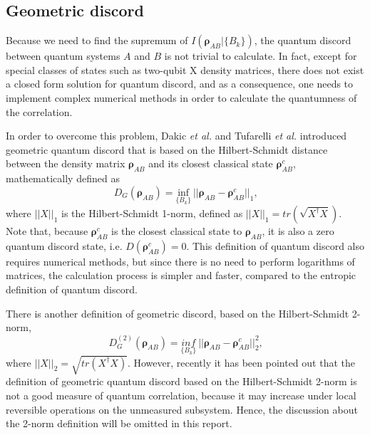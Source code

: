 \documentclass[%
 reprint,
 amsmath,amssymb,
 aps,
]{revtex4-1}
\begin{document}
\subsection{Geometric discord}
\noindent Because we need to find the supremum of $\textit{I}(\boldsymbol{\rho}_{AB}|\{B_k\})$, the quantum discord between quantum systems $A$ and $B$ is not trivial to calculate. In fact, except for special classes of states such as two-qubit X density matrices, there does not exist a closed form solution for quantum discord, and as a consequence, one needs to implement complex numerical methods in order to calculate the quantumness of the correlation. 

In order to overcome this problem, Dakic \textit{et al.} and Tufarelli \textit{et al.} introduced geometric quantum discord that is based on the Hilbert-Schmidt distance between the density matrix $\boldsymbol{\rho}_{AB}$ and its closest classical state $\boldsymbol{\rho}_{AB}^{c}$, mathematically defined as
\begin{equation}
\textit{D}_G(\boldsymbol{\rho}_{AB}) = \underset{\{B_k\}}{\text{inf}}\  ||\boldsymbol{\rho}_{AB} - \boldsymbol{\rho}_{AB}^{c}||_{1}  \label{geom.} \text{,}
\end{equation}
\noindent where $||X||_{1}$ is the Hilbert-Schmidt 1-norm, defined as $||X||_{1} = tr(\sqrt{X^{\dagger}X})$. Note that, because $\boldsymbol{\rho}_{AB}^{c}$ is the closest classical state to $\boldsymbol{\rho}_{AB}$, it is also a zero quantum discord state, i.e. $\textit{D}(\boldsymbol{\rho}_{AB}^{c}) = 0$. This definition of quantum discord also requires numerical methods, but since there is no need to perform logarithms of matrices, the calculation process is simpler and faster, compared to the entropic definition of quantum discord.

There is another definition of geometric discord, based on the Hilbert-Schmidt 2-norm, 
\begin{equation}
\textit{D}_{G}^{(2)}(\boldsymbol{\rho}_{AB}) = \underset{\{B_k\}}{inf}\  ||\boldsymbol{\rho}_{AB} - \boldsymbol{\rho}_{AB}^{c}||_{2}^{2}  \text{,}
\end{equation}
\noindent where $||X||_{2} =\sqrt{tr(X^{\dagger}X)}$. However, recently it has been pointed out that the definition of geometric quantum discord based on the Hilbert-Schmidt 2-norm is not a good measure of quantum correlation, because it may increase under local reversible operations on the unmeasured subsystem. Hence, the discussion about the 2-norm definition will be omitted in this report. 
\end{document}
